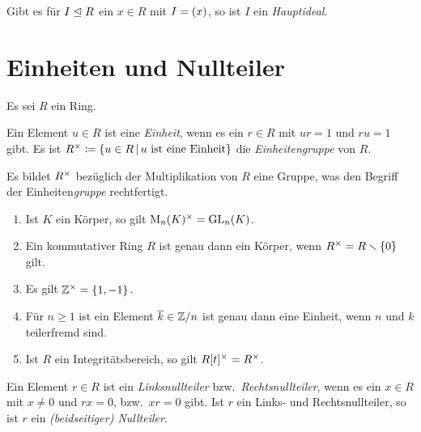 \begin{definition}
  Gibt es für $I \mathrel{\trianglelefteq} R$ ein $x \in R$ mit $I = (x)$, so ist $I$ ein \emph{Hauptideal}.
\end{definition}





\section{Einheiten und Nullteiler}

Es sei $R$ ein Ring.

\begin{definition}
  Ein Element $u \in R$ ist eine \emph{Einheit}, wenn es ein $r \in R$ mit $ur = 1$ und $ru = 1$ gibt.
  Es ist
  $
              \unitgroup{R}
    \defined  \{
                u \in R
              \suchthat 
                \text{$u$ ist eine Einheit}
              \}
  $
  die \emph{Einheitengruppe} von $R$.
\end{definition}

Es bildet $R^{\times}$ bezüglich der Multiplikation von $R$ eine Gruppe, was den Begriff der Einheiten\emph{gruppe} rechtfertigt.

\begin{example}
  \begin{enumerate}
    \item
      Ist $K$ ein Körper, so gilt $\operatorname{M}_{n}(K)^{\times} = \operatorname{GL}_{n}(K)$.
    \item
      Ein kommutativer Ring $R$ ist genau dann ein Körper, wenn $R^{\times} = R \smallsetminus \{0\}$ gilt.
    \item
      Es gilt $\mathbb{Z}^{\times} = \{1, -1\}$.
    \item
      Für $n \geq 1$ ist ein Element $\overline{k} \in \mathbb{Z}/n$ ist genau dann eine Einheit, wenn $n$ und $k$ teilerfremd sind.
    \item
      Ist $R$ ein Integritätsbereich, so gilt $R[t]^{\times} = R^{\times}$.
  \end{enumerate}
\end{example}

\begin{definition}
  Ein Element $r \in R$ ist ein \emph{Linksnullteiler} bzw.\ \emph{Rechtsnullteiler}, wenn es ein $x \in R$ mit $x \neq 0$ und $rx = 0$, bzw.\ $xr = 0$ gibt.
  Ist $r$ ein Links- und Rechtsnullteiler, so ist $r$ ein \emph{\textup(beidseitiger\textup) Nullteiler}.
\end{definition}

